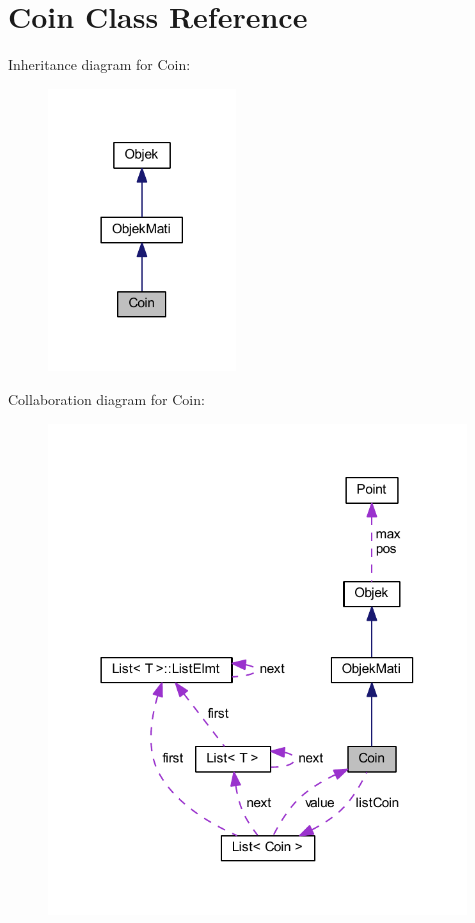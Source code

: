 \hypertarget{class_coin}{}\section{Coin Class Reference}
\label{class_coin}


Inheritance diagram for Coin\+:\nopagebreak
\begin{figure}[H]
\begin{center}
\leavevmode
\includegraphics[width=141pt]{class_coin__inherit__graph}
\end{center}
\end{figure}


Collaboration diagram for Coin\+:\nopagebreak
\begin{figure}[H]
\begin{center}
\leavevmode
\includegraphics[width=314pt]{class_coin__coll__graph}
\end{center}
\end{figure}
